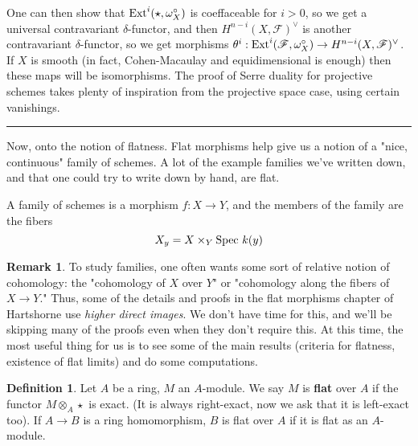 \documentclass[10pt,reqno]{amsart}
\theoremstyle{definition}
\newtheorem{definition}[theorem]{Definition}
\newtheorem{remark}[theorem]{Remark}
\theoremstyle{remark}
\numberwithin{equation}{section}
\numberwithin{theorem}{section}
\newcommand{\spec}{\textup{Spec }}
\newcommand{\Ext}{\textup{Ext}}
\newcommand{\FF}{{\mathscr F}}
\begin{document}
One can then show that $\Ext^i(\star,\omega_X^{\circ})$ is coeffaceable for $i > 0$, so we get a universal contravariant $\delta$-functor, and then $H^{n-i}(X,\FF)^{\vee}$ is another contravariant $\delta$-functor, so we get morphisms $\theta^i: \Ext^i(\FF,\omega^{\circ}_X) \to H^{n-i}(X,\FF)^{\vee}$. If $X$ is smooth (in fact, Cohen-Macaulay and equidimensional is enough) then these maps will be isomorphisms. The proof of Serre duality for projective schemes takes plenty of inspiration from the projective space case, using certain vanishings.
\\

\hrule
\vspace{1em}

Now, onto the notion of flatness. Flat morphisms help give us a notion of a "nice, continuous" family of schemes. A lot of the example families we've written down, and that one could try to write down by hand, are flat. 

A family of schemes is a morphism $f: X \to Y$, and the members of the family are the fibers
\[X_y = X \times_Y \spec k(y)\]

\begin{remark}
To study families, one often wants some sort of relative notion of cohomology: the "cohomology of $X$ over $Y$" or "cohomology along the fibers of $X \to Y$." Thus, some of the details and proofs in the flat morphisms chapter of Hartshorne use \textit{higher direct images}. We don't have time for this, and we'll be skipping many of the proofs even when they don't require this. At this time, the most useful thing for us is to see some of the main results (criteria for flatness, existence of flat limits) and do some computations.
\end{remark}

\begin{definition} Let $A$ be a ring, $M$ an $A$-module. We say $M$ is \textbf{flat} over $A$ if the functor $M \otimes_A \star$ is exact. (It is always right-exact, now we ask that it is left-exact too). If $A \to B$ is a ring homomorphism, $B$ is flat over $A$ if it is flat as an $A$-module.
\end{definition}
\end{document}
